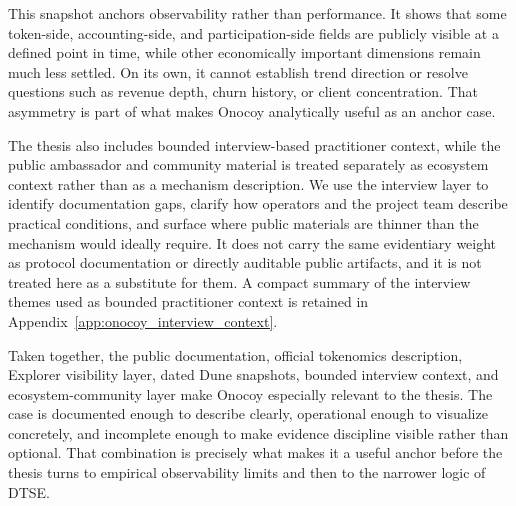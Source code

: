 This snapshot anchors observability rather than performance. It shows that some token-side, accounting-side, and participation-side fields are publicly visible at a defined point in time, while other economically important dimensions remain much less settled. On its own, it cannot establish trend direction or resolve questions such as revenue depth, churn history, or client concentration. That asymmetry is part of what makes Onocoy analytically useful as an anchor case.

The thesis also includes bounded interview-based practitioner context, while the public ambassador and community material is treated separately as ecosystem context rather than as a mechanism description. We use the interview layer to identify documentation gaps, clarify how operators and the project team describe practical conditions, and surface where public materials are thinner than the mechanism would ideally require. It does not carry the same evidentiary weight as protocol documentation or directly auditable public artifacts, and it is not treated here as a substitute for them.
A compact summary of the interview themes used as bounded practitioner context is retained in Appendix~\ref{app:onocoy_interview_context}.

Taken together, the public documentation, official tokenomics description, Explorer visibility layer, dated Dune snapshots, bounded interview context, and ecosystem-community layer make Onocoy especially relevant to the thesis. The case is documented enough to describe clearly, operational enough to visualize concretely, and incomplete enough to make evidence discipline visible rather than optional. That combination is precisely what makes it a useful anchor before the thesis turns to empirical observability limits and then to the narrower logic of DTSE.
